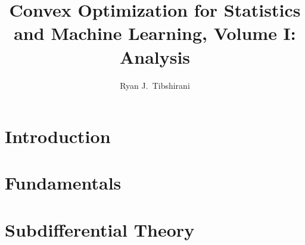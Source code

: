 \documentclass[oneside]{gsm-l} %
\numberwithin{section}{chapter}
\numberwithin{equation}{chapter}
\numberwithin{figure}{chapter}
\begin{document}
\frontmatter

\title{Convex Optimization for Statistics and Machine Learning, Volume I:
  Analysis} 
\author{Ryan J.\ Tibshirani}


\maketitle


\setcounter{page}{5} %
\setcounter{tocdepth}{1} %
\tableofcontents

%

\mainmatter


\part{Introduction}



\part{Fundamentals}




\part{Subdifferential Theory}


 
\end{document}
